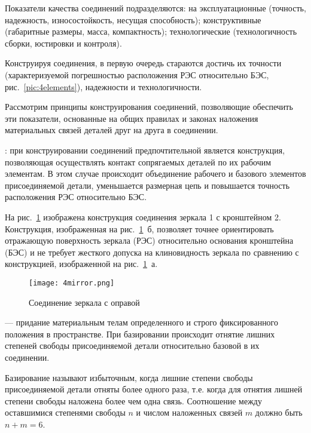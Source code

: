 Показатели качества соединений подразделяются: на эксплуатационные (точность, надежность, износостойкость, несущая способность); конструктивные (габаритные размеры, масса, компактность); технологические (технологичность сборки, юстировки и контроля).

Конструируя соединения, в первую очередь стараются достичь их точности (характеризуемой погрешностью расположения РЭС относительно БЭС, рис.~\ref{pic:4elements}), надежности и технологичности.

Рассмотрим принципы конструирования соединений, позволяющие обеспечить эти показатели, основанные на общих правилах и законах наложения материальных связей деталей друг на друга в соединении.

: при конструировании соединений предпочтительной является конструкция, позволяющая осуществлять контакт сопрягаемых деталей по их рабочим элементам. 
В этом случае происходит объединение рабочего и базового элементов присоединяемой детали, уменьшается размерная цепь и повышается точность расположения РЭС относительно БЭС.

На рис.~\ref{pic:4mirror} изображена конструкция соединения зеркала 1 с кронштейном 2. 
Конструкция, изображенная на рис.~\ref{pic:4mirror}~б, позволяет точнее ориентировать отражающую поверхность зеркала (РЭС) относительно основания кронштейна (БЭС) и не требует жесткого допуска на клиновидность зеркала по сравнению с конструкцией, изображенной на рис.~\ref{pic:4mirror}~а.

\begin{figure}[h!]
	\begin{center}
		\caption{Соединение зеркала с оправой}
		\texttt{[image: 4mirror.png]}
		\label{pic:4mirror}
	\end{center}
\end{figure}

 --- придание материальным телам определенного и строго фиксированного положения в пространстве. 
При базировании происходит отнятие лишних степеней свободы присоединяемой детали относительно базовой в их соединении.

Базирование называют избыточным, когда лишние степени свободы присоединяемой детали отняты более одного раза, т.е. когда для отнятия лишней степени свободы наложена более чем одна связь. 
Соотношение между оставшимися степенями свободы $n$ и числом наложенных связей $ m $ должно быть $ n+m = 6 $.

